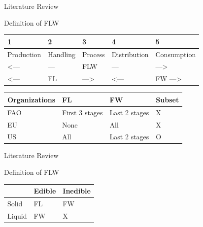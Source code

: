 \documentclass[
  ignorenonframetext,
]{beamer}
\begin{document}
\begin{frame}{Literature Review}
\protect\hypertarget{literature-review-2}{}
\begin{block}{Definition of FLW}
\protect\hypertarget{definition-of-flw-1}{}
\begin{longtable}[]{@{}lllll@{}}
\toprule()
1 & 2 & 3 & 4 & 5 \\
\midrule()
\endhead
Production & Handling & Process & Distribution & Consumption \\
\textless--- & --- & FLW & --- & ---\textgreater{} \\
\textless--- & FL & ---\textgreater{} & \textless--- & FW
---\textgreater{} \\
\bottomrule()
\end{longtable}

\begin{longtable}[]{@{}llll@{}}
\toprule()
Organizations & FL & FW & Subset \\
\midrule()
\endhead
FAO & First 3 stages & Last 2 stages & X \\
EU & None & All & X \\
US & All & Last 2 stages & O \\
\bottomrule()
\end{longtable}
\end{block}
\end{frame}

\begin{frame}{Literature Review}
\protect\hypertarget{literature-review-3}{}
\begin{block}{Definition of FLW}
\protect\hypertarget{definition-of-flw-2}{}
\begin{longtable}[]{@{}lll@{}}
\toprule()
& Edible & Inedible \\
\midrule()
\endhead
Solid & FL & FW \\
Liquid & FW & X \\
\bottomrule()
\end{longtable}
\end{block}
\end{frame}
\end{document}
